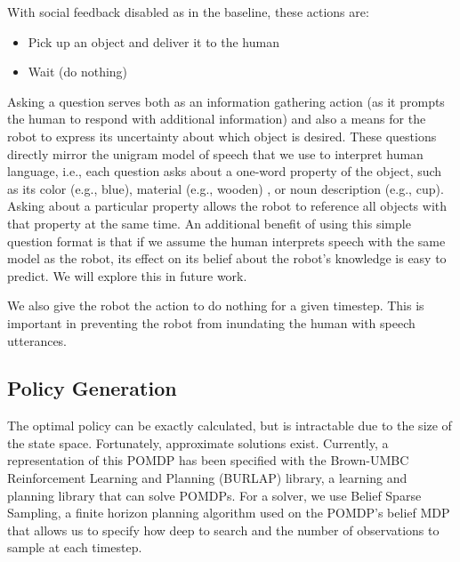 \documentclass[letterpaper]{article}
\newcommand{\stnote}[1]{\textcolor{blue}{\textbf{ST: #1}}}
\begin{document}
With social feedback disabled as in the baseline, these actions are: 
\begin{itemize}
	\item Pick up an object and deliver it to the human
  \item Wait (do nothing)
\end{itemize}

Asking a question serves both as an information gathering action (as it prompts
the human to respond with additional information) and also a means for the
robot to express its uncertainty about which object is desired. These questions
directly mirror the unigram model of speech that we use to interpret human
language, i.e., each question asks about a one-word property of the object,
such as its color (e.g., blue), material (e.g., wooden) , or noun description
(e.g., cup). Asking about a particular property allows the robot to reference
all objects with that property at the same time. An additional benefit of using
this simple question format is that if we assume the human interprets speech
with the same model as the robot, its effect on its belief about the robot's
knowledge is easy to predict.  We will explore this in future work. 

We also give the robot the action to do nothing for a given timestep. This is
important in preventing the robot from inundating the human with speech
utterances. 

\subsection{Policy Generation}






The optimal policy can be exactly calculated, but is intractable due
to the size of the state space. Fortunately, approximate solutions
exist. Currently, a representation of this POMDP has been specified
with the Brown-UMBC Reinforcement Learning and Planning (BURLAP) library\cite{burlap}, a
learning and planning library that can solve POMDPs.  For a solver, we use  Belief Sparse Sampling, a finite horizon
planning algorithm used on the POMDP's belief MDP that allows us to specify how deep to search and the number of observations to sample at each timestep. 
\end{document}
